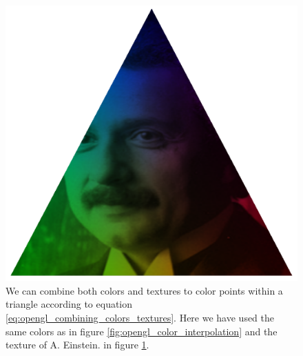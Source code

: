 \begin{figure}[h]
\begin{center}
\includegraphics[width=\textwidth, trim=0cm 0cm 0cm 0cm, clip]{opengl/figures/color_and_texture.png}
\end{center}
\caption{We can combine both colors and textures to color points within a triangle according to equation \eqref{eq:opengl_combining_colors_textures}. Here we have used the same colors as in figure \ref{fig:opengl_color_interpolation} and the texture of A. Einstein. in figure \ref{fig:opengl_texture_interpolation}.}
\label{fig:opengl_texture_interpolation}
\end{figure}
